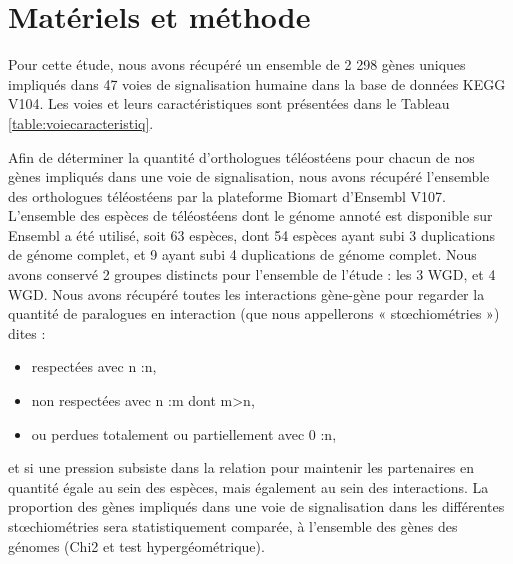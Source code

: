 \section{Matériels et méthode}
\par Pour cette étude, nous avons récupéré un ensemble de 2 298 gènes uniques impliqués dans 47 voies de signalisation humaine dans la base de données KEGG V104. Les voies et leurs caractéristiques sont présentées dans le Tableau \ref{table:voiecaracteristiq}.  
\par Afin de déterminer la quantité d’orthologues téléostéens pour chacun de nos gènes impliqués dans une voie de signalisation, nous avons récupéré l’ensemble des orthologues téléostéens par la plateforme Biomart d’Ensembl V107. L’ensemble des espèces de téléostéens dont le génome annoté est disponible sur Ensembl a été utilisé, soit 63 espèces, dont 54 espèces ayant subi 3 duplications de génome complet, et 9 ayant subi 4 duplications de génome complet. Nous avons conservé 2 groupes distincts pour l’ensemble de l’étude : les 3 WGD, et 4 WGD. Nous avons récupéré toutes les interactions gène-gène pour regarder la quantité de paralogues en interaction (que nous appellerons « stœchiométries ») dites :
\begin{itemize}
    \item respectées avec n :n,
    \item non respectées avec n :m dont m>n, 
    \item ou perdues totalement ou partiellement avec 0 :n,
\end{itemize}
et si une pression subsiste dans la relation pour maintenir les partenaires en quantité égale au sein des espèces, mais également au sein des interactions. La proportion des gènes impliqués dans une voie de signalisation dans les différentes stœchiométries sera statistiquement comparée, à l’ensemble des gènes des génomes (Chi2 et test hypergéométrique). 

